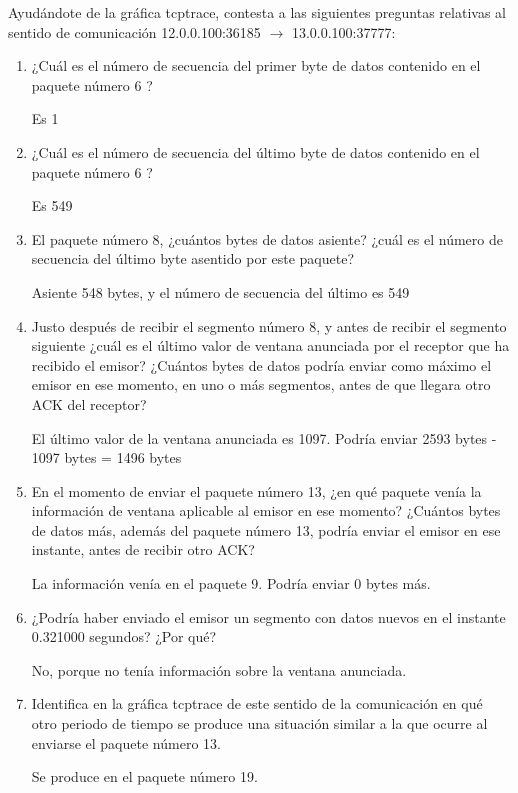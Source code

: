 \documentclass[12pt, a4paper]{report}
\begin{document}
Ayudándote de la gráfica tcptrace, contesta a las siguientes preguntas relativas al sentido de comunicación 12.0.0.100:36185 $\rightarrow$ 13.0.0.100:37777:

\begin{enumerate}
	\item ¿Cuál es el número de secuencia del primer byte de datos contenido en el paquete número 6 ?
	
	Es 1
	
	\item ¿Cuál es el número de secuencia del último byte de datos contenido en el paquete número 6 ?
	
	Es 549
	
	\item El paquete número 8, ¿cuántos bytes de datos asiente? ¿cuál es el número de secuencia del último byte asentido por este paquete?
	
	Asiente 548 bytes, y el número de secuencia del último es 549
	
	\item Justo después de recibir el segmento número 8, y antes de recibir el segmento siguiente ¿cuál es el último valor de ventana anunciada por el receptor que ha recibido el emisor? ¿Cuántos bytes de datos podría enviar como máximo el emisor en ese momento, en uno o más segmentos, antes de que llegara otro ACK del receptor?
	
	El último valor de la ventana anunciada es 1097. Podría enviar 2593 bytes - 1097 bytes = 1496 bytes
	
	\item En el momento de enviar el paquete número 13, ¿en qué paquete venía la información de ventana aplicable al emisor en ese momento? ¿Cuántos bytes de datos más, además del paquete número 13, podría enviar el emisor en ese instante, antes de recibir otro ACK?
	
	La información venía en el paquete 9. Podría enviar 0 bytes más.
	
	\item ¿Podría haber enviado el emisor un segmento con datos nuevos en el instante 0.321000 segundos? ¿Por qué?
	
	No, porque no tenía información sobre la ventana anunciada.
	
	\item Identifica en la gráfica tcptrace de este sentido de la comunicación en qué otro periodo de tiempo se produce una situación similar a la que ocurre al enviarse el paquete número 13.
	
	Se produce en el paquete número 19.
	
\end{enumerate}
\end{document}
